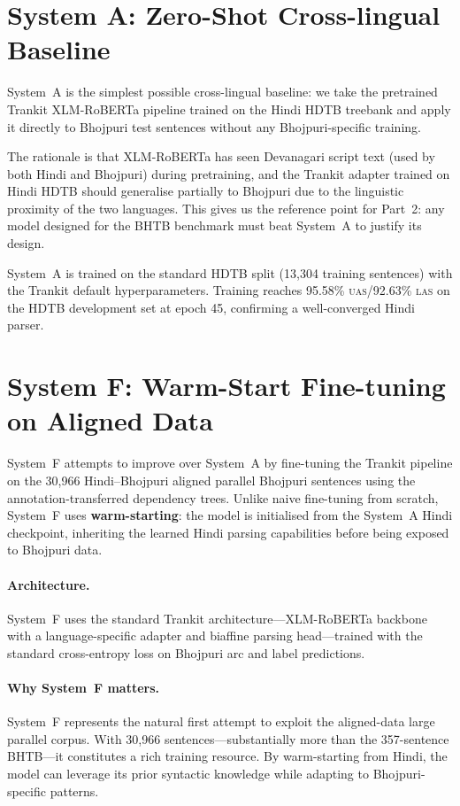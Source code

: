 \documentclass[12pt,a4paper,oneside]{report}
\newcommand{\bho}{Bhojpuri}
\newcommand{\hi}{Hindi}
\newcommand{\xlmr}{XLM-RoBERTa}
\newcommand{\uas}{\textsc{uas}}
\newcommand{\las}{\textsc{las}}
\begin{document}
\section{System A: Zero-Shot Cross-lingual Baseline}
\label{sec:system_a}

System~A is the simplest possible cross-lingual baseline: we take the pretrained
Trankit \xlmr{} pipeline trained on the Hindi HDTB treebank and apply it directly to
\bho{} test sentences without any Bhojpuri-specific training.

The rationale is that \xlmr{} has seen Devanagari script text (used by both \hi{} and
\bho{}) during pretraining, and the Trankit adapter trained on Hindi HDTB should
generalise partially to \bho{} due to the linguistic proximity of the two languages.
This gives us the reference point for Part~2: any model designed for the BHTB
benchmark must beat System~A to justify its design.

System~A is trained on the standard HDTB split (13,304 training sentences) with
the Trankit default hyperparameters. Training reaches 95.58\% \uas{}/92.63\% \las{}
on the HDTB development set at epoch 45, confirming a well-converged Hindi parser.

\section{System F: Warm-Start Fine-tuning on Aligned Data}
\label{sec:system_f}

System~F attempts to improve over System~A by fine-tuning the Trankit pipeline on the
30,966 Hindi--Bhojpuri aligned parallel \bho{} sentences using the annotation-transferred
dependency trees. Unlike naive fine-tuning from scratch, System~F uses
\textbf{warm-starting}: the model is initialised from the System~A Hindi checkpoint,
inheriting the learned Hindi parsing capabilities before being exposed to Bhojpuri
data.

\paragraph{Architecture.}
System~F uses the standard Trankit architecture---\xlmr{} backbone with a
language-specific adapter and biaffine parsing head---trained with the standard
cross-entropy loss on Bhojpuri arc and label predictions.

\paragraph{Why System~F matters.}
System~F represents the natural first attempt to exploit the aligned-data large
parallel corpus. With 30,966 sentences---substantially more than the 357-sentence
BHTB---it constitutes a rich training resource. By warm-starting from Hindi, the
model can leverage its prior syntactic knowledge while adapting to Bhojpuri-specific
patterns.
\end{document}
